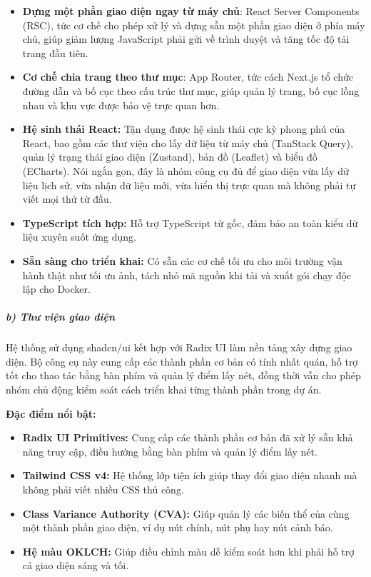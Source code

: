 \documentclass[a4paper]{extarticle}
\providecommand{\tightlist}{%
  \setlength{\itemsep}{0pt}\setlength{\parskip}{0pt}}
\begin{document}
\begin{itemize}
\tightlist
\item
  \textbf{Dựng một phần giao diện ngay từ máy chủ}: React Server Components
  (RSC), tức cơ chế cho phép xử lý và dựng sẵn một phần giao diện ở phía
  máy chủ, giúp giảm lượng JavaScript phải gửi về trình duyệt và tăng
  tốc độ tải trang đầu tiên.
\item
  \textbf{Cơ chế chia trang theo thư mục}: App Router, tức cách Next.js
  tổ chức đường dẫn và bố cục theo cấu trúc thư mục, giúp quản lý trang,
  bố cục lồng nhau và khu vực được bảo vệ trực quan hơn.
\item
  \textbf{Hệ sinh thái React:} Tận dụng được hệ sinh thái cực kỳ phong
  phú của React, bao gồm các thư viện cho lấy dữ liệu từ máy chủ
  (TanStack Query), quản lý trạng thái giao diện (Zustand), bản đồ
  (Leaflet) và biểu đồ (ECharts). Nói ngắn gọn, đây là nhóm công cụ đủ
  để giao diện vừa lấy dữ liệu lịch sử, vừa nhận dữ liệu mới, vừa hiển
  thị trực quan mà không phải tự viết mọi thứ từ đầu.
\item
  \textbf{TypeScript tích hợp:} Hỗ trợ TypeScript từ gốc, đảm bảo an
  toàn kiểu dữ liệu xuyên suốt ứng dụng.
\item
  \textbf{Sẵn sàng cho triển khai:} Có sẵn các cơ chế tối ưu cho môi
  trường vận hành thật như tối ưu ảnh, tách nhỏ mã nguồn khi tải và xuất gói
  chạy độc lập cho Docker.
\end{itemize}

\subparagraph{b) Thư viện giao diện}\label{b-thux1b0-viux1ec7n-giao-diux1ec7n-ui-component-library}

Hệ thống sử dụng shadcn/ui kết hợp với Radix UI làm nền tảng xây dựng
giao diện. Bộ công cụ này cung cấp các thành phần cơ bản có tính nhất
quán, hỗ trợ tốt cho thao tác bằng bàn phím và quản lý điểm lấy nét,
đồng thời vẫn cho phép nhóm chủ động kiểm soát cách triển khai từng
thành phần trong dự án.

\textbf{Đặc điểm nổi bật:}

\begin{itemize}
\tightlist
\item
  \textbf{Radix UI Primitives:} Cung cấp các thành phần cơ bản đã xử lý
  sẵn khả năng truy cập, điều hướng bằng bàn phím và quản lý điểm lấy nét.
\item
  \textbf{Tailwind CSS v4:} Hệ thống lớp tiện ích giúp thay đổi giao diện
  nhanh mà không phải viết nhiều CSS thủ công.
\item
  \textbf{Class Variance Authority (CVA):} Giúp quản lý các biến thể của
  cùng một thành phần giao diện, ví dụ nút chính, nút phụ hay nút cảnh báo.
\item
  \textbf{Hệ màu OKLCH:} Giúp điều chỉnh màu dễ kiểm soát hơn khi phải
  hỗ trợ cả giao diện sáng và tối.
\end{itemize}
\end{document}

